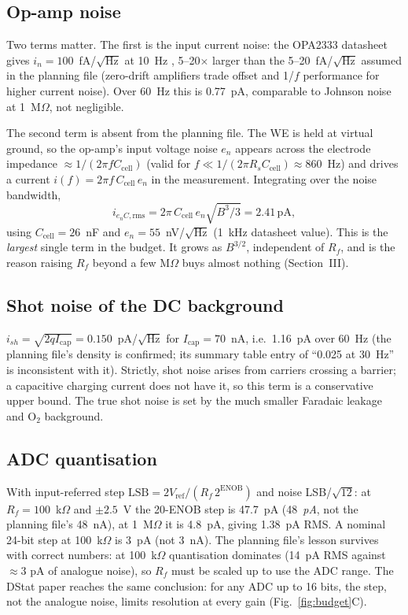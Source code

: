 \documentclass[10pt]{article}
\numberwithin{equation}{section}
\newcommand{\pA}{\,\mathrm{pA}}
\begin{document}
\subsection{Op-amp noise}
Two terms matter. The first is the input current noise: the OPA2333 datasheet gives $i_n = 100$~fA/$\sqrt{\text{Hz}}$ at 10~Hz \cite{opa},
5--20$\times$ larger than the 5--20~fA/$\sqrt{\text{Hz}}$ assumed in the planning file (zero-drift amplifiers trade offset and 1/$f$
performance for higher current noise). Over 60~Hz this is 0.77~pA, comparable to Johnson noise at 1~M$\Omega$, not negligible.

The second term is absent from the planning file. The WE is held at virtual ground, so the op-amp's input voltage noise $e_n$ appears across the
electrode impedance $\approx 1/(2\pi fC_{\text{cell}})$ (valid for $f \ll 1/(2\pi R_sC_{\text{cell}}) \approx 860$~Hz) and drives a
current $i(f) = 2\pi f\,C_{\text{cell}}\,e_n$ in the measurement. Integrating over the noise bandwidth,
\begin{equation}
i_{e_nC,\text{rms}} = 2\pi\,C_{\text{cell}}\,e_n\sqrt{B^{3}/3} = 2.41\pA ,
\end{equation}
using $C_{\text{cell}} = 26$~nF and $e_n = 55$~nV/$\sqrt{\text{Hz}}$ (1~kHz datasheet value). This is the \emph{largest} single term in the budget.
It grows as $B^{3/2}$, independent of $R_f$, and is the reason raising $R_f$ beyond a few M$\Omega$ buys almost nothing (Section~III).

\subsection{Shot noise of the DC background}
$i_{sh} = \sqrt{2qI_{\text{cap}}} = 0.150$~pA/$\sqrt{\text{Hz}}$ for $I_{\text{cap}} = 70$~nA, i.e.\ 1.16~pA over 60~Hz (the planning file's density is confirmed; its
summary table entry of ``0.025 at 30~Hz'' is inconsistent with it). Strictly, shot noise arises from carriers crossing a barrier; a capacitive
charging current does not have it, so this term is a conservative upper bound. The true shot noise is set by the much smaller Faradaic leakage
and O$_2$ background.

\subsection{ADC quantisation}
With input-referred step $\text{LSB} = 2V_{\text{ref}}/(R_f\,2^{\text{ENOB}})$ and noise LSB/$\sqrt{12}$: at $R_f = 100$~k$\Omega$ and $\pm2.5$~V the 20-ENOB
step is 47.7~pA (48~\emph{pA}, not the planning file's 48~nA), at 1~M$\Omega$ it is 4.8~pA, giving 1.38~pA RMS. A nominal 24-bit step at 100~k$\Omega$ is 3~pA (not 3~nA).
The planning file's lesson survives with correct numbers: at 100~k$\Omega$ quantisation dominates (14~pA RMS against $\approx$3 pA of analogue noise), so $R_f$ must be scaled up
to use the ADC range. The DStat paper reaches the same conclusion: for any ADC up to 16 bits, the step, not the analogue noise, limits resolution at every gain \cite{dstat}
(Fig.~\ref{fig:budget}C).
\end{document}
